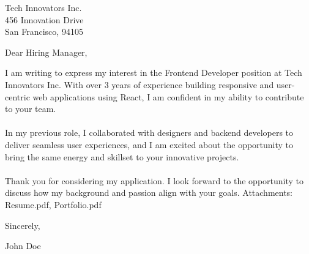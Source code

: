 \documentclass[11pt,a4paper]{letter}
\begin{document}
\begin{letter}{
Tech Innovators Inc.\\
456 Innovation Drive\\
San Francisco, 94105
}
\address{
John Doe\\
123 Main Street\\
New York, 10001\\
+1234567890\\
\href{mailto:john.doe@example.com}{john.doe@example.com}
}
\date{April 15, 2025}
\opening{Dear Hiring Manager,}
I am writing to express my interest in the Frontend Developer position at Tech Innovators Inc. With over 3 years of experience building responsive and user-centric web applications using React, I am confident in my ability to contribute to your team.\\
\\
In my previous role, I collaborated with designers and backend developers to deliver seamless user experiences, and I am excited about the opportunity to bring the same energy and skillset to your innovative projects.\\
\\
Thank you for considering my application. I look forward to the opportunity to discuss how my background and passion align with your goals.
\vspace{\baselineskip}\noindent Attachments: Resume.pdf, Portfolio.pdf
\closing{Sincerely,}
\vspace{0.5in}
John Doe
\end{letter}
\end{document}
